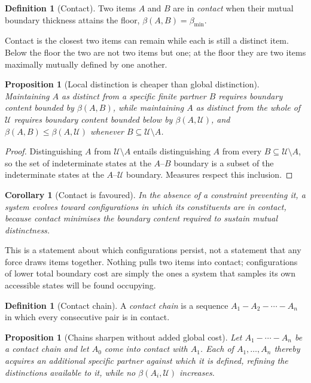 \documentclass[11pt,twocolumn,a4paper]{article}
\theoremstyle{plain}
\newtheorem{proposition}[theorem]{Proposition}
\newtheorem{corollary}[theorem]{Corollary}
\theoremstyle{definition}
\newtheorem{definition}[theorem]{Definition}
\theoremstyle{remark}
\newcommand{\Univ}{\mathcal{U}}
\newcommand{\thick}{\beta}
\newcommand{\floor}{\thick_{\min}}
\begin{document}
\begin{definition}[Contact]
\label{def:contact}
Two items $A$ and $B$ are in \emph{contact} when their mutual boundary
thickness attains the floor, $\thick(A,B) = \floor$.
\end{definition}

Contact is the closest two items can remain while each is still a distinct
item. Below the floor the two are not two items but one; at the floor they
are two items maximally mutually defined by one another.

\begin{proposition}[Local distinction is cheaper than global distinction]
\label{prop:local-cheaper}
Maintaining $A$ as distinct from a specific finite partner $B$ requires
boundary content bounded by $\thick(A,B)$, while maintaining $A$ as distinct
from the whole of $\Univ$ requires boundary content bounded below by
$\thick(A,\Univ)$, and $\thick(A,B) \leq \thick(A,\Univ)$ whenever $B
\subseteq \Univ \setminus A$.
\end{proposition}

\begin{proof}
Distinguishing $A$ from $\Univ\setminus A$ entails distinguishing $A$ from
every $B \subseteq \Univ\setminus A$, so the set of indeterminate states at
the $A$--$B$ boundary is a subset of the indeterminate states at the
$A$--$\Univ$ boundary. Measures respect this inclusion.
\end{proof}

\begin{corollary}[Contact is favoured]
\label{cor:contact-favoured}
In the absence of a constraint preventing it, a system evolves toward
configurations in which its constituents are in contact, because contact
minimises the boundary content required to sustain mutual distinctness.
\end{corollary}

This is a statement about which configurations persist, not a statement
that any force draws items together. Nothing pulls two items into contact;
configurations of lower total boundary cost are simply the ones a system
that samples its own accessible states will be found occupying.

\begin{definition}[Contact chain]
\label{def:chain}
A \emph{contact chain} is a sequence $A_1 - A_2 - \cdots - A_n$ in which
every consecutive pair is in contact.
\end{definition}

\begin{proposition}[Chains sharpen without added global cost]
\label{prop:chain}
Let $A_1 - \cdots - A_n$ be a contact chain and let $A_0$ come into contact
with $A_1$. Each of $A_1, \ldots, A_n$ thereby acquires an additional
specific partner against which it is defined, refining the distinctions
available to it, while no $\thick(A_i,\Univ)$ increases.
\end{proposition}
\end{document}
